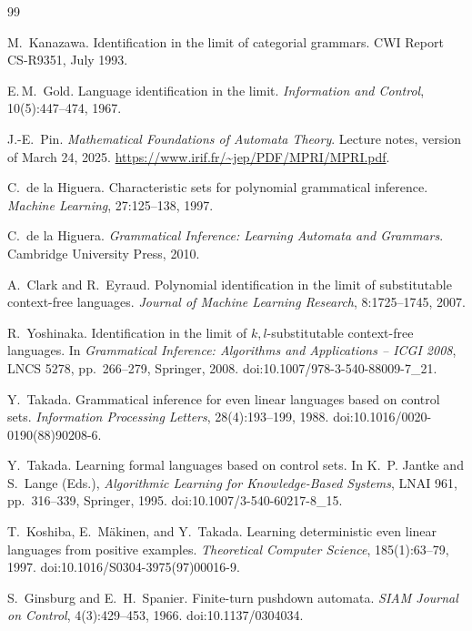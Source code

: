 \documentclass[11pt,a4paper]{ltjsarticle}
\theoremstyle{remark}
\theoremstyle{plain}
\begin{document}
\begin{thebibliography}{99}

M.~Kanazawa.
\newblock Identification in the limit of categorial grammars.
\newblock CWI Report CS-R9351, July 1993.


E.\,M.~Gold.
Language identification in the limit.
\textit{Information and Control}, 10(5):447--474, 1967.

J.-E.~Pin.
\newblock \emph{Mathematical Foundations of Automata Theory}.
\newblock Lecture notes, version of March 24, 2025.
\newblock \url{https://www.irif.fr/~jep/PDF/MPRI/MPRI.pdf}.

C.~de la Higuera.
Characteristic sets for polynomial grammatical inference.
\textit{Machine Learning}, 27:125--138, 1997.

C.~de la Higuera.
\textit{Grammatical Inference: Learning Automata and Grammars}.
Cambridge University Press, 2010.


A.~Clark and R.~Eyraud.
Polynomial identification in the limit of substitutable
context-free languages.
\textit{Journal of Machine Learning Research},
8:1725--1745, 2007.

R.~Yoshinaka.
Identification in the limit of $k, l$-substitutable
context-free languages.
In \textit{Grammatical Inference: Algorithms and Applications -- ICGI 2008},
LNCS 5278, pp.~266--279, Springer, 2008.
doi:10.1007/978-3-540-88009-7\_21.


Y.~Takada.
\newblock Grammatical inference for even linear languages based on control sets.
\newblock \textit{Information Processing Letters}, 28(4):193--199, 1988.
doi:10.1016/0020-0190(88)90208-6.

Y.~Takada.
\newblock Learning formal languages based on control sets.
\newblock In K.~P. Jantke and S.~Lange (Eds.), \textit{Algorithmic Learning
for Knowledge-Based Systems}, LNAI 961, pp.~316--339, Springer, 1995.
doi:10.1007/3-540-60217-8\_15.

T.~Koshiba, E.~M\"akinen, and Y.~Takada.
\newblock Learning deterministic even linear languages from positive examples.
\newblock \textit{Theoretical Computer Science}, 185(1):63--79, 1997.
doi:10.1016/S0304-3975(97)00016-9.

S.~Ginsburg and E.~H.~Spanier.
\newblock Finite-turn pushdown automata.
\newblock \textit{SIAM Journal on Control}, 4(3):429--453, 1966.
doi:10.1137/0304034.


\end{thebibliography}
\end{document}
